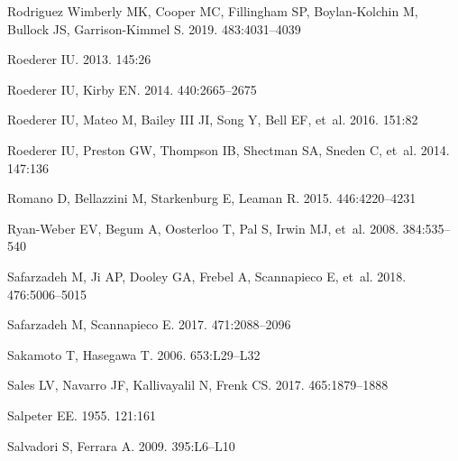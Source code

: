 \documentclass[a4paper]{ar-1col}
\begin{document}
\begin{thebibliography}{}
{Rodriguez Wimberly} MK, {Cooper} MC, {Fillingham} SP, {Boylan-Kolchin} M,
  {Bullock} JS, {Garrison-Kimmel} S. 2019.
\textit{\mnras} 483:4031--4039

{Roederer} IU. 2013.
\textit{\aj} 145:26

{Roederer} IU, {Kirby} EN. 2014.
\textit{\mnras} 440:2665--2675

{Roederer} IU, {Mateo} M, {Bailey} III JI, {Song} Y, {Bell} EF, et~al. 2016.
\textit{\aj} 151:82

{Roederer} IU, {Preston} GW, {Thompson} IB, {Shectman} SA, {Sneden} C, et~al.
  2014.
\textit{\aj} 147:136

{Romano} D, {Bellazzini} M, {Starkenburg} E, {Leaman} R. 2015.
\textit{\mnras} 446:4220--4231

{Ryan-Weber} EV, {Begum} A, {Oosterloo} T, {Pal} S, {Irwin} MJ, et~al. 2008.
\textit{\mnras} 384:535--540

{Safarzadeh} M, {Ji} AP, {Dooley} GA, {Frebel} A, {Scannapieco} E, et~al. 2018.
\textit{\mnras} 476:5006--5015

{Safarzadeh} M, {Scannapieco} E. 2017.
\textit{\mnras} 471:2088--2096

{Sakamoto} T, {Hasegawa} T. 2006.
\textit{\apjl} 653:L29--L32

{Sales} LV, {Navarro} JF, {Kallivayalil} N, {Frenk} CS. 2017.
\textit{\mnras} 465:1879--1888

{Salpeter} EE. 1955.
\textit{\apj} 121:161

{Salvadori} S, {Ferrara} A. 2009.
\textit{\mnras} 395:L6--L10


\end{thebibliography}
\end{document}
